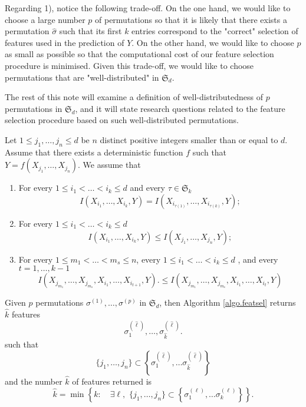 Regarding 1),
notice the following trade-off.
On the one hand,
we would like to choose
a large number $p$ of permutations
so that 
it is likely that 
there exists a permutation $\hat{\sigma}$ 
such that
its first $k$ entries correspond to 
the "correct" selection of features 
used in the prediction of $Y$.
On the other hand,
we would like to choose
$p$ as small as possible
so that
the computational cost of our 
feature selection procedure is
minimised.
Given this trade-off, 
we would like to choose permutations 
that are "well-distributed" in
$\mathfrak{S}_d$.


The rest of this note
will
examine 
a definition of 
well-distributedness of $p$ permutations in $\mathfrak{S}_d$,
and it will state research questions related to 
the
feature selection procedure
based on such well-distributed permutations.

\begin{prop}
	\label{prop.deterministicdep}
	Let 
	$1\leq j_1, \dots, j_n\leq d$ 
	be $n$ distinct positive integers smaller than or equal to $d$.
	Assume that 
	there exists a deterministic function $f$ such that
	$Y = f(X_{j_1}, \dots, X_{j_n})$.
	We assume that
	\begin{enumerate}
		\item 
		For every 
		$1\leq i_1 <  \dots < i_k\leq d$
		and
		every $\tau \in \mathfrak{S}_k$
		$$
		I(X_{i_1}, \dots, X_{i_k}, Y)
		= 
		I(X_{i_{\tau(1)}}, \dots, X_{i_{\tau(k)}}, Y);
		$$
		\item
		For every 
		$1\leq i_1 <  \dots < i_k\leq d$
		$$
		I(X_{i_1}, \dots, X_{i_k}, Y)
		\leq
		I(X_{j_1}, \dots, X_{j_n}, Y);
		$$
		\item 
		For every 
		$1\leq m_1 < \dots < m_s \leq n$,
		every
		$1\leq i_1 <  \dots < i_k\leq d$ ,
		and every $t=1, \dots, k-1$
		$$
			I(X_{j_{m_1}}, \dots , X_{j_{m_s}}, X_{i_1}, \dots, X_{i_{t+1}}, Y).
		\leq
			I(X_{j_{m_1}}, \dots , X_{j_{m_s}}, X_{i_1}, \dots, X_{i_t}, Y)
		$$
	\end{enumerate}
	Given $p$ permutations
	$\sigma^{(1)}, \dots, \sigma^{(p)}$
	in
	$\mathfrak{S}_d$,
	then 
	Algorithm \ref{algo.featsel}
	returns $\hat{k}$ features 
	$$
	\sigma^{(\hat{\ell})}_{1}, \dots, \sigma^{(\hat{\ell})}_{\hat{k}}.
	$$
	such that
	\begin{equation}
		\lbrace j_1, \dots, j_n\rbrace
		\subset
		\left
		\lbrace
		\sigma^{(\hat{\ell})}_1,
		\dots
		\sigma^{(\hat{\ell})}_{\hat{k}}
		\right
		\rbrace
	\end{equation}
	and
	the number $\hat{k}$ of features returned 
	is 
	\begin{equation}
		\hat{k}
		=
		\min
		\left\lbrace
		k:
		\quad
		\exists \ell,
		\,\,
		\lbrace j_1, \dots, j_n\rbrace
		\subset
		\left
		\lbrace
		\sigma^{(\ell)}_1,
		\dots
		\sigma^{(\ell)}_k
		\right
		\rbrace
		\right\rbrace.
	\end{equation}
\end{prop}


